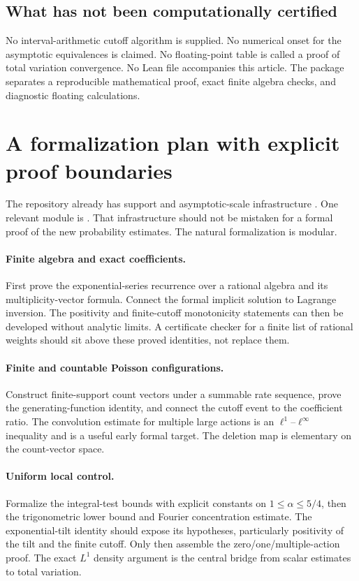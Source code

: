 \documentclass[11pt,a4paper]{article}
\numberwithin{equation}{section}
\theoremstyle{definition}
\theoremstyle{remark}
\begin{document}
\subsection{What has not been computationally certified}
No interval-arithmetic cutoff algorithm is supplied. No numerical onset
for the asymptotic equivalences is claimed. No floating-point table is
called a proof of total variation convergence. No Lean file accompanies
this article. The package separates a reproducible mathematical proof,
exact finite algebra checks, and diagnostic floating calculations.

\section{A formalization plan with explicit proof boundaries}
\label{sec:formal}
The repository already has support and asymptotic-scale infrastructure
\cite{repo-project,repo-index}. One relevant module is
. That infrastructure should not be
mistaken for a formal proof of the new probability estimates. The natural
formalization is modular.

\paragraph{Finite algebra and exact coefficients.}
First prove the exponential-series recurrence over a rational algebra and
its multiplicity-vector formula. Connect the formal implicit solution to
Lagrange inversion. The positivity and finite-cutoff monotonicity
statements can then be developed without analytic limits. A certificate
checker for a finite list of rational weights should sit above these
proved identities, not replace them.

\paragraph{Finite and countable Poisson configurations.}
Construct finite-support count vectors under a summable rate sequence,
prove the generating-function identity, and connect the cutoff event to
the coefficient ratio. The convolution estimate for multiple large
actions is an $\ell^1$--$\ell^\infty$ inequality and is a useful early
formal target. The deletion map is elementary on the count-vector space.

\paragraph{Uniform local control.}
Formalize the integral-test bounds with explicit constants on
$1\le\alpha\le5/4$, then the trigonometric lower bound and Fourier
concentration estimate. The exponential-tilt identity should expose its
hypotheses, particularly positivity of the tilt and the finite cutoff.
Only then assemble the zero/one/multiple-action proof. The exact
$L^1$ density argument is the central bridge from scalar estimates to
total variation.
\end{document}
